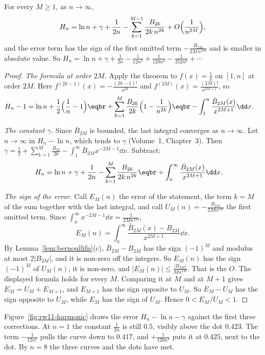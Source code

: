 \begin{corollary}\label{cor:harmonic}
For every $M\ge1$, as $n\to\infty$,
\[
H_n=\ln n+\gamma+\frac1{2n}-\sum_{k=1}^{M-1}\frac{B_{2k}}{2k\,n^{2k}}+O\Bigl(\frac1{n^{2M}}\Bigr),
\]
and the error term has the sign of the first omitted term $-\frac{B_{2M}}{2M\,n^{2M}}$ and is smaller in absolute value. So $H_n=\ln n+\gamma+\frac1{2n}-\frac1{12n^2}+\frac1{120n^4}-\frac1{252n^6}+\cdots$
\end{corollary}
\begin{proof}
\emph{The formula at order $2M$.} Apply the theorem to $f(x)=\frac1x$ on $[1,n]$ at order $2M$. Here $f^{(2k-1)}(x)=-\frac{(2k-1)!}{x^{2k}}$ and $f^{(2M)}(x)=\frac{(2M)!}{x^{2M+1}}$, so
\[
\begin{aligned}H_n-1&=\ln n+\frac12\Bigl(\frac1n-1\Bigr)\eqbr+\sum_{k=1}^M\frac{B_{2k}}{2k}\Bigl(1-\frac1{n^{2k}}\Bigr)\eqbr-\int_1^n\frac{\bar B_{2M}(x)}{x^{2M+1}}\dd x.\end{aligned}
\]

\emph{The constant $\gamma$.} Since $\bar B_{2M}$ is bounded, the last integral converges as $n\to\infty$. Let $n\to\infty$ in $H_n-\ln n$, which tends to $\gamma$ (Volume~1, Chapter~3). Then $\gamma=\frac12+\sum_{k=1}^M\frac{B_{2k}}{2k}-\int_1^\infty\bar B_{2M}x^{-2M-1}\dd x$. Subtract:
\[
\begin{aligned}H_n&=\ln n+\gamma+\frac1{2n}-\sum_{k=1}^M\frac{B_{2k}}{2k\,n^{2k}}\eqbr+\int_n^\infty\frac{\bar B_{2M}(x)}{x^{2M+1}}\dd x.\end{aligned}
\]

\emph{The sign of the error.} Call $E_M(n)$ the error of the statement, the term $k=M$ of the sum together with the last integral, and call $U_M(n)=-\frac{B_{2M}}{2Mn^{2M}}$ the first omitted term. Since $\int_n^\infty x^{-2M-1}\dd x=\frac1{2Mn^{2M}}$,
\[
E_M(n)=\int_n^\infty\frac{\bar B_{2M}(x)-B_{2M}}{x^{2M+1}}\dd x.
\]
By Lemma~\ref{lem:bernoullifn}(c), $\bar B_{2M}-B_{2M}$ has the sign $(-1)^M$ and modulus at most $2|B_{2M}|$, and it is non-zero off the integers. So $E_M(n)$ has the sign $(-1)^M$ of $U_M(n)$, it is non-zero, and $|E_M(n)|\le\frac{|B_{2M}|}{Mn^{2M}}$. That is the $O$. The displayed formula holds for every $M$. Comparing it at $M$ and at $M+1$ gives $E_M=U_M+E_{M+1}$, and $E_{M+1}$ has the sign opposite to $U_M$. So $E_M-U_M$ has the sign opposite to $U_M$, while $E_M$ has the sign of $U_M$. Hence $0<E_M/U_M<1$.
\end{proof}

Figure~\ref{fig:rw11-harmonic} draws the error $H_n-\ln n-\gamma$ against the first three corrections. At $n=1$ the constant $\frac1{2n}$ is still $0.5$, visibly above the dot $0.423$. The term $-\frac1{12n^2}$ pulls the curve down to $0.417$, and $+\frac1{120n^4}$ puts it at $0.425$, next to the dot. By $n=8$ the three curves and the dots have met.

